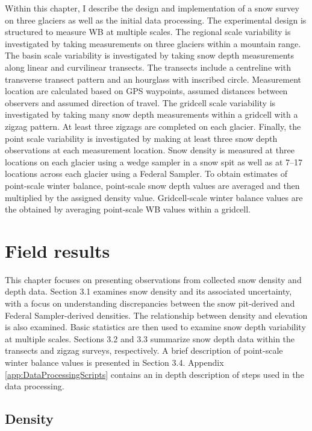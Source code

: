 \documentclass{sfuthesis}
\begin{document}
Within this chapter, I describe the design and implementation of a snow survey on three glaciers as well as the initial data processing. The experimental design is structured to measure WB at multiple scales. The regional scale variability is investigated by taking measurements on three glaciers within a mountain range. The basin scale variability is investigated by taking snow depth measurements along linear and curvilinear transects. The transects include a centreline with transverse transect pattern and an hourglass with inscribed circle. Measurement location are calculated based on GPS waypoints, assumed distances between observers and assumed direction of travel. The gridcell scale variability is investigated by taking many snow depth measurements within a gridcell with a zigzag pattern. At least three zigzags are completed on each glacier. Finally, the point scale variability is investigated by making at least three snow depth observations at each measurement location. Snow density is measured at three locations on each glacier using a wedge sampler in a snow spit as well as at 7--17 locations across each glacier using a Federal Sampler. To obtain estimates of point-scale winter balance, point-scale snow depth values are averaged and then multiplied by the assigned density value. Gridcell-scale winter balance values are the obtained by averaging point-scale WB values within a gridcell. 




\chapter{Field results}

This chapter focuses on presenting observations from collected snow density and depth data. Section 3.1 examines snow density and its associated uncertainty, with a focus on understanding discrepancies between the snow pit-derived and Federal Sampler-derived densities. The relationship between density and elevation is also examined. Basic statistics are then used to examine snow depth variability at multiple scales. Sections 3.2 and 3.3 summarize snow depth data within the transects and zigzag surveys, respectively. A brief description of point-scale winter balance values is presented in Section 3.4. Appendix \ref{app:DataProcessingScripts} contains an in depth description of steps used in the data processing.


\section{Density}
\label{sec:density}
\end{document}
